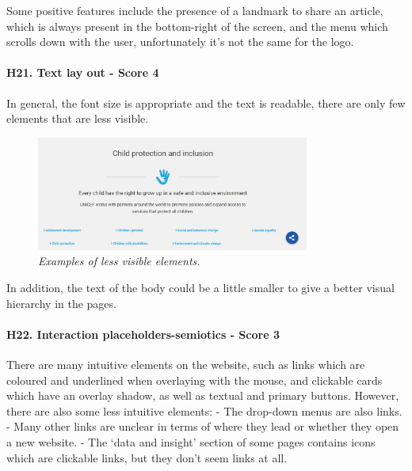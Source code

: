 \newline Some positive features include the presence of a landmark to share an article, which is always present in the bottom-right of the screen, and the menu which scrolls down with the user, unfortunately it’s not the same for the logo.
\newline
\newline \paragraph{H21. Text lay out - Score 4}  \label{subsec:H21}	In general, the font size is appropriate and the text is readable, there are only few elements that are less visible.
\begin{figure}[!h]
	\begin{center}
		\includegraphics[width=0.8\textwidth]{FinalScores24.jpg}
		\captionsetup{font=small}
		\caption{\textit{Examples of less visible elements.}}
	\end{center}
\end{figure}
\newline In addition, the text of the body could be a little smaller to give a better visual hierarchy in the pages.
\newline
\newline \paragraph{H22. Interaction placeholders-semiotics - Score 3}  \label{subsec:H22}	There are many intuitive elements on the website, such as links which are coloured and underlined when overlaying with the mouse, and clickable cards which have an overlay shadow, as well as textual and primary buttons.
\newline However, there are also some less intuitive elements:
\newline -	The drop-down menus are also links.
\newline -	Many other links are unclear in terms of where they lead or whether they open a new website.
\newline -	The ‘data and insight’ section of some pages contains icons which are clickable links, but they don’t seem links at all.
